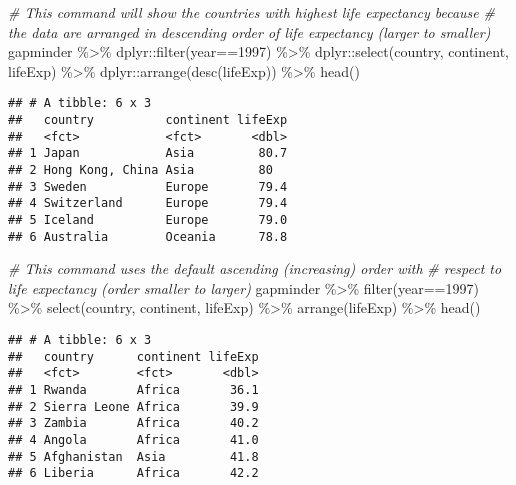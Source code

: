 \documentclass[
]{book}
\newenvironment{Shaded}{\begin{snugshade}}{\end{snugshade}}
\newcommand{\CommentTok}[1]{\textcolor[rgb]{0.56,0.35,0.01}{\textit{#1}}}
\newcommand{\DecValTok}[1]{\textcolor[rgb]{0.00,0.00,0.81}{#1}}
\newcommand{\FunctionTok}[1]{\textcolor[rgb]{0.00,0.00,0.00}{#1}}
\newcommand{\NormalTok}[1]{#1}
\newcommand{\SpecialCharTok}[1]{\textcolor[rgb]{0.00,0.00,0.00}{#1}}
\begin{document}
\begin{Shaded}
\begin{Highlighting}[]
\CommentTok{\# This command will show the countries with highest life expectancy because }
\CommentTok{\# the data are arranged in descending order of life expectancy (larger to smaller)}
\NormalTok{gapminder }\SpecialCharTok{\%\textgreater{}\%} 
\NormalTok{  dplyr}\SpecialCharTok{::}\FunctionTok{filter}\NormalTok{(year}\SpecialCharTok{==}\DecValTok{1997}\NormalTok{) }\SpecialCharTok{\%\textgreater{}\%}   
\NormalTok{  dplyr}\SpecialCharTok{::}\FunctionTok{select}\NormalTok{(country, continent, lifeExp) }\SpecialCharTok{\%\textgreater{}\%} 
\NormalTok{  dplyr}\SpecialCharTok{::}\FunctionTok{arrange}\NormalTok{(}\FunctionTok{desc}\NormalTok{(lifeExp)) }\SpecialCharTok{\%\textgreater{}\%} 
  \FunctionTok{head}\NormalTok{()}
\end{Highlighting}
\end{Shaded}

\begin{verbatim}
## # A tibble: 6 x 3
##   country          continent lifeExp
##   <fct>            <fct>       <dbl>
## 1 Japan            Asia         80.7
## 2 Hong Kong, China Asia         80  
## 3 Sweden           Europe       79.4
## 4 Switzerland      Europe       79.4
## 5 Iceland          Europe       79.0
## 6 Australia        Oceania      78.8
\end{verbatim}

\begin{Shaded}
\begin{Highlighting}[]
\CommentTok{\# This command uses the default ascending (increasing) order with}
\CommentTok{\# respect to life expectancy (order smaller to larger)}
\NormalTok{gapminder }\SpecialCharTok{\%\textgreater{}\%} 
  \FunctionTok{filter}\NormalTok{(year}\SpecialCharTok{==}\DecValTok{1997}\NormalTok{) }\SpecialCharTok{\%\textgreater{}\%}  
  \FunctionTok{select}\NormalTok{(country, continent, lifeExp) }\SpecialCharTok{\%\textgreater{}\%} 
  \FunctionTok{arrange}\NormalTok{(lifeExp) }\SpecialCharTok{\%\textgreater{}\%} 
  \FunctionTok{head}\NormalTok{()}
\end{Highlighting}
\end{Shaded}

\begin{verbatim}
## # A tibble: 6 x 3
##   country      continent lifeExp
##   <fct>        <fct>       <dbl>
## 1 Rwanda       Africa       36.1
## 2 Sierra Leone Africa       39.9
## 3 Zambia       Africa       40.2
## 4 Angola       Africa       41.0
## 5 Afghanistan  Asia         41.8
## 6 Liberia      Africa       42.2
\end{verbatim}
\end{document}
